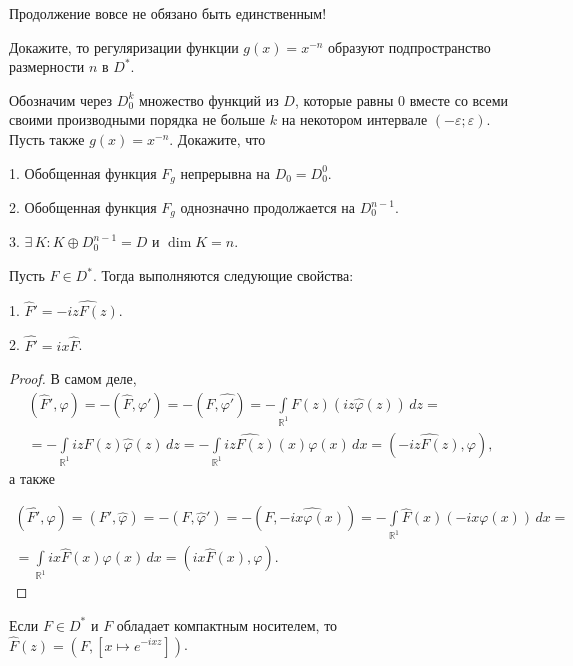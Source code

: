 \documentclass[10pt,titlepage, a4paper]{article}
\begin{document}
\begin{zam}
Продолжение вовсе не обязано быть единственным!
\end{zam}

\begin{upr}
Докажите, то регуляризации функции $g(x)=x^{-n}$ образуют
подпространство размерности $n$ в $D^*$.
\end{upr}

\begin{upr}
Обозначим через $D_0^k$ множество функций из $D$, которые равны 0
вместе со всеми своими производными порядка не больше $k$ на
некотором интервале $(-\varepsilon;\varepsilon)$. Пусть также
$g(x)=x^{-n}$. Докажите, что

1. Обобщенная функция $F_g$ непрерывна на $D_0=D_0^0$.

2. Обобщенная функция $F_g$ однозначно продолжается на $D_0^{n-1}$.

3. $\exists\,K:K\oplus D_0^{n-1}=D$ и $\dim K=n$.
\end{upr}

\begin{theorem}
Пусть $F\in D^*$. Тогда выполняются следующие свойства:

1. $\hat{F}'=\widehat{-iz F(z)}$.

2. $\widehat{F'}=ix\hat{F}$.
\end{theorem}

\begin{proof}
В самом деле,
\begin{multline*}
(\hat{F}',\varphi)=-(\hat{F},\varphi')=-(F,\widehat{\varphi'})=-\int\limits_{\mathbb{R}^1}\!
F(z)(iz\hat{\varphi}(z))\,dz=\\=
-\int\limits_{\mathbb{R}^1}\!izF(z)\hat{\varphi}(z)\,dz=-\int\limits_{\mathbb{R}^1}\!
\widehat{izF(z)}(x)\varphi(x)\,dx=(\widehat{-izF(z)},\varphi),
\end{multline*}
а также

\begin{multline*}
(\widehat{F'},\varphi)=(F',\hat{\varphi})=-(F,\hat{\varphi}')=-(F,\widehat{-ix\varphi(x)})=
-\int\limits_{\mathbb{R}^1}\!\hat{F}(x)(-ix\varphi(x))\,dx=\\=
\int\limits_{\mathbb{R}^1}\!ix\hat{F}(x)\varphi(x)\,dx=(ix\hat{F}(x),\varphi).
\end{multline*}
\end{proof}

\begin{predl}
Если $F\in D^*$ и $F$ обладает компактным носителем, то
$\hat{F}(z)=(F,[x\mapsto e^{-ixz}])$.
\end{predl}
\end{document}
